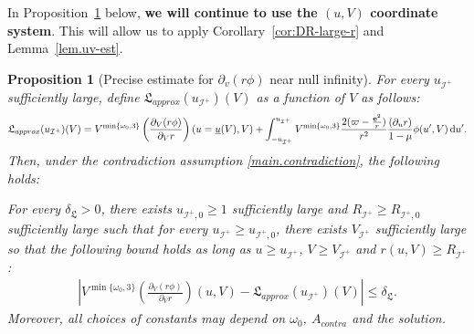 \documentclass[10pt, reqno]{amsart}
\newtheorem{proposition}[theorem]{Proposition}
\theoremstyle{definition}
\theoremstyle{remark}
\theoremstyle{conjecture}
\numberwithin{equation}{section}
\newcommand{\ud}{\mathrm{d}}
\newcommand{\rd}{\partial}
\newcommand{\0}{\emptyset}
\newcommand{\omg}{\omega}
\newcommand{\bfe}{{\bf e}}
\newcommand{\calI}{\mathcal I}
\newcommand{\f}{\frac}
\newcommand{\de}{\delta}
\newcommand{\e}{\bfe}							%
\newcommand{\NI}{\calI^{+}}						%
\begin{document}
In Proposition~\ref{prop.rdvrphi.precise} below, \textbf{we will continue to use the $(u,V)$ coordinate system}. This will allow us to apply Corollary~\ref{cor:DR-large-r} and Lemma~\ref{lem.uv-est}.


\begin{proposition}[Precise estimate for $\rd_v(r\phi)$ near null infinity]\label{prop.rdvrphi.precise}
For every $u_{\calI^+}$ sufficiently large, define $\mathfrak L_{approx}(u_{\calI^+})(V)$ as a function of $V$ as follows: 
$$\mathfrak L_{approx}(u_{\calI^+})(V)=V^{\min\{\omg_0,3\}}\left(\f{\rd_V(r\phi)}{\rd_V r}\right)(u=\underline{u}(V),V)+ \int_{-u_{\calI^+}}^{u_{\calI^+}}  V^{\min\{\omg_0,3\}}\frac{2(\varpi - \frac{\e^{2}}{r})}{r^{2}} \frac{(\rd_{u} r)}{1-\mu}\phi(u',V) \, \ud u'.$$
Then, under the contradiction assumption \eqref{main.contradiction}, the following holds:

For every $\de_{\mathfrak L}>0$, there exists $u_{\calI^+,0}\geq 1$ sufficiently large and $R_{\calI^+}\geq R_{\NI,0}$ sufficiently large such that for every $ u_{\calI^+}\geq u_{\calI^+,0}$, there exists $V_{\calI^+}$ sufficiently large so that the following bound holds as long as $u\geq u_{\calI^+}$, $V \geq V_{\calI^+}$ and $r(u,V)\geq R_{\calI^+}$:
\begin{equation*}
\begin{split}
\left| V^{\min\{\omg_0,3\}}\left(\f{\rd_V(r\phi)}{\rd_V r}\right)(u,V)
- \mathfrak L_{approx}(u_{\calI^+})(V)\right|\leq  \de_{\mathfrak L}.
\end{split}
\end{equation*}
Moreover, all choices of constants may depend on $\omg_0$, $A_{contra}$ and the solution.
\end{proposition}
\end{document}
